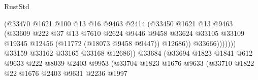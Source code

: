 \begin{lexlean}{RustStd}
\begin{coremodule}
                                              (@33470
                                                @1621
                                                @100
                                                @13
                                                @16
                                                @9463
                                                @2414
                                                (@33450
                                                  @1621
                                                  @13
                                                  @9463
                                                  (@33609
                                                    @222
                                                    @37
                                                    @13
                                                    @7610
                                                    @2624
                                                    @9446
                                                    @9458
                                                    @33624
                                                    @33105
                                                    @33109
                                                    @19345
                                                    @12456
                                                    (@11772 (@18073 @9458 @9447))
                                                    @12686))
                                                @33666)))))))
                                  @33159
                                  @33162
                                  @33165
                                  @33168
                                  @12686))
                              @33684
                              (@33694
                                @1823
                                @1841
                                @612
                                @9633
                                @222
                                @8039
                                @2403
                                @9953
                                (@33704
                                  @1823
                                  @1676
                                  @9633
                                  (@33710
                                    @1822
                                    @22
                                    @1676
                                    @2403
                                    @9631
                                    @2236
                                    @1997

\end{coremodule}
\end{lexlean}

